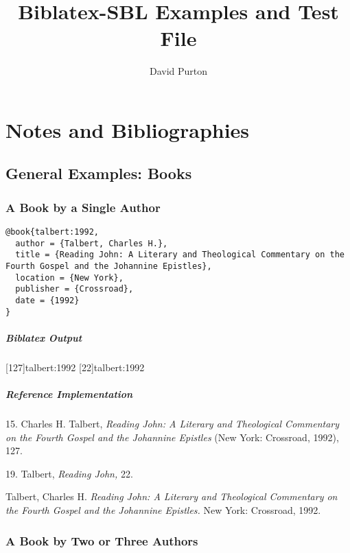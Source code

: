 \documentclass[a4paper]{article}
\newenvironment{biboutput}{%
  \subparagraph{Biblatex Output}
}{\color{black}}
\newenvironment{refimp}{%
  \subparagraph{Reference Implementation}
  \color{reference-colour}
  \rm
}{\par\color{black}}
\begin{document}
\title{Biblatex-SBL Examples and Test File}
\author{David Purton}
\maketitle

\tableofcontents

\clearpage

\setcounter{section}{5}

\section{Notes and Bibliographies}

\setcounter{subsection}{1}
\subsection{General Examples: Books}

\subsubsection{A Book by a Single Author}

\begin{lstlisting}
@book{talbert:1992,
  author = {Talbert, Charles H.},
  title = {Reading John: A Literary and Theological Commentary on the Fourth Gospel and the Johannine Epistles},
  location = {New York},
  publisher = {Crossroad},
  date = {1992}
}
\end{lstlisting}

\begin{biboutput}
  [127]{talbert:1992}
  [22]{talbert:1992}
\end{biboutput}

\begin{refimp}
  \hspace*{\bibindent}15. Charles H. Talbert, \emph{Reading John: A Literary
  and Theological Commentary on the Fourth Gospel and the Johannine Epistles}
  (New York: Crossroad, 1992), 127.

  \hspace*{\bibindent}19. Talbert, \emph{Reading John,} 22.

  \hangindent\bibindent Talbert, Charles H. \emph{Reading John: A Literary and
  Theological Commentary on the Fourth Gospel and the Johannine Epistles.} New
  York: Crossroad, 1992.
\end{refimp}

\subsubsection{A Book by Two or Three Authors}
\end{document}
